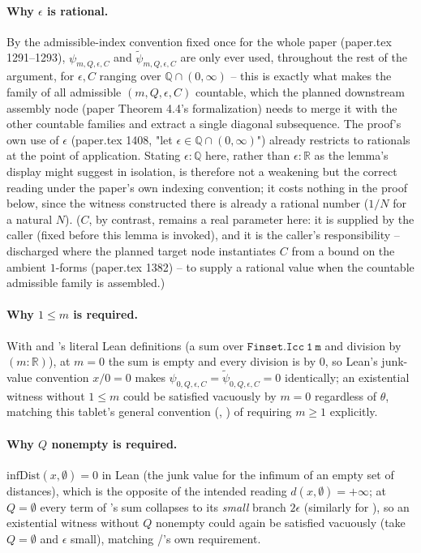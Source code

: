 \begin{lemma}
  \paragraph{Why $\epsilon$ is rational.} By the admissible-index convention fixed once for the
  whole paper (paper.tex 1291--1293), $\psi_{m,Q,\epsilon,C}$ and $\tilde\psi_{m,Q,\epsilon,C}$ are
  only ever used, throughout the rest of the argument, for $\epsilon,C$ ranging over
  $\mathbb{Q}\cap(0,\infty)$ -- this is exactly what makes the family of all admissible
  $(m,Q,\epsilon,C)$ countable, which the planned downstream assembly node (paper Theorem 4.4's
  formalization) needs to merge it with the other countable families and extract a single diagonal
  subsequence. The proof's own use of $\epsilon$
  (paper.tex 1408, "let $\epsilon \in \mathbb{Q}\cap(0,\infty)$") already restricts to rationals at
  the point of application. Stating $\epsilon:\mathbb{Q}$ here, rather than $\epsilon:\mathbb{R}$
  as the lemma's display might suggest in isolation, is therefore not a weakening but the correct
  reading under the paper's own indexing convention; it costs nothing in the proof below, since the
  witness constructed there is already a rational number ($1/N$ for a natural $N$). ($C$, by
  contrast, remains a real parameter here: it is supplied by the caller (fixed before this lemma is
  invoked), and it is the caller's responsibility -- discharged where the planned target node
  instantiates $C$ from a bound on the ambient $1$-forms (paper.tex 1382) -- to supply a rational
  value when the countable admissible family is assembled.)

  \paragraph{Why $1 \le m$ is required.} With  and 's literal Lean
  definitions (a sum over $\mathtt{Finset.Icc\ 1\ m}$ and division by $(m:\mathbb{R})$), at $m=0$
  the sum is empty and every division is by $0$, so Lean's junk-value convention $x/0=0$ makes
  $\psi_{0,Q,\epsilon,C}=\tilde\psi_{0,Q,\epsilon,C}=0$ identically; an existential witness without
  $1\le m$ could be satisfied vacuously by $m=0$ regardless of $\theta$, matching this tablet's
  general convention (, ) of requiring $m\ge1$ explicitly.

  \paragraph{Why $Q$ nonempty is required.} $\mathrm{infDist}(x,\emptyset)=0$ in Lean (the junk
  value for the infimum of an empty set of distances), which is the opposite of the intended
  reading $d(x,\emptyset)=+\infty$; at $Q=\emptyset$ every term of 's sum collapses to
  its \emph{small} branch $2\epsilon$ (similarly for ), so an existential witness
  without $Q$ nonempty could again be satisfied vacuously (take $Q=\emptyset$ and $\epsilon$ small),
  matching /'s own requirement.


\end{lemma}
